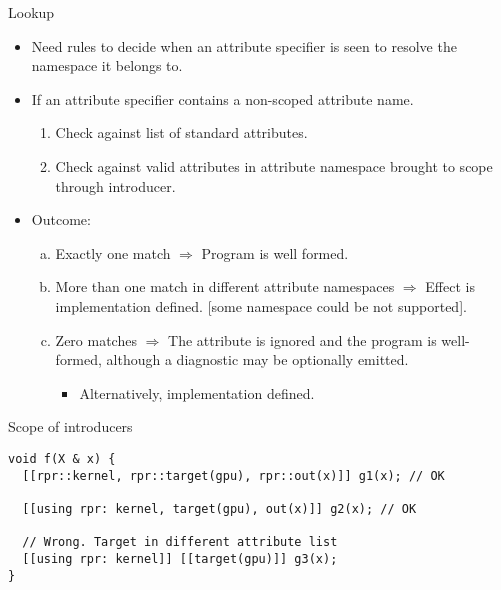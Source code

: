 \begin{frame}[t,shrink]{Lookup}
\begin{itemize}
  \item Need rules to decide when an attribute specifier is seen to resolve the namespace
        it belongs to.
\end{itemize}
\vfill\pause
\begin{itemize}
  \item If an attribute specifier contains a non-scoped attribute name.
    \begin{enumerate}[1]
      \item Check against list of standard attributes.
      \item Check against valid attributes in attribute namespace brought to scope through  introducer.
    \end{enumerate}
  \pause
  \item Outcome:
    \begin{enumerate}[a)]
      \item Exactly one match $\Rightarrow$ Program is well formed.
      
      \item More than one match in different attribute namespaces
      $\Rightarrow$
      Effect is implementation defined. [some namespace could be not supported].
      
      \item Zero matches 
      $\Rightarrow$
      The attribute is ignored and the
      program is well-formed, although a diagnostic may be optionally emitted.
        \begin{itemize}
          \item Alternatively, implementation defined.
        \end{itemize}
    \end{enumerate}
\end{itemize}
\end{frame}

\begin{frame}[t,fragile]{Scope of introducers}
\begin{lstlisting}
void f(X & x) {
  [[rpr::kernel, rpr::target(gpu), rpr::out(x)]] g1(x); // OK

  [[using rpr: kernel, target(gpu), out(x)]] g2(x); // OK

  // Wrong. Target in different attribute list
  [[using rpr: kernel]] [[target(gpu)]] g3(x); 
}
\end{lstlisting}

\end{frame}


